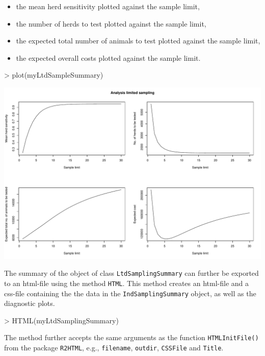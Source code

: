 \documentclass[nojss]{jss}
\begin{document}
\begin{itemize}
\item the mean herd sensitivity plotted against the sample limit,
\item the number of herds to test plotted against the sample limit,
\item the expected total number of animals to test plotted against the sample limit,
\item the expected overall costs plotted against the sample limit.
\end{itemize}

\begin{Schunk}
\begin{Sinput}
> plot(myLtdSampleSummary)
\end{Sinput}
\end{Schunk}
\includegraphics{FFD-intro-009}

The summary of the object of class \texttt{LtdSamplingSummary} can further be exported to an html-file using the method \texttt{HTML}.  This method creates an html-file and a css-file containing the the data in the \texttt{IndSamplingSummary} object, as well as the diagnostic plots.


\begin{Schunk}
\begin{Sinput}
> HTML(myLtdSamplingSummary)
\end{Sinput}
\end{Schunk}

The method further accepts the same arguments as the function \texttt{HTMLInitFile()} from the package \texttt{R2HTML}, e.g., \texttt{filename}, \texttt{outdir}, \texttt{CSSFile} and \texttt{Title}.
\end{document}
